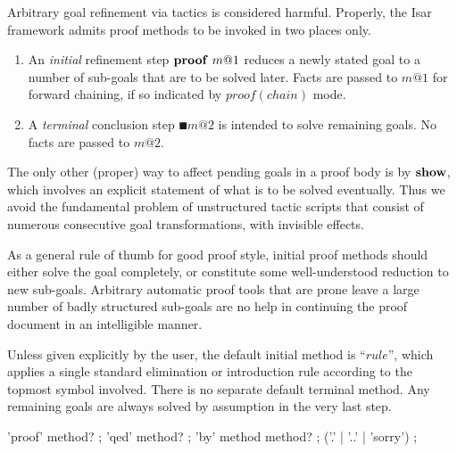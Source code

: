 Arbitrary goal refinement via tactics is considered harmful.  Properly, the
Isar framework admits proof methods to be invoked in two places only.
\begin{enumerate}
\item An \emph{initial} refinement step $\PROOF{m@1}$ reduces a newly stated
  goal to a number of sub-goals that are to be solved later.  Facts are passed
  to $m@1$ for forward chaining, if so indicated by $proof(chain)$ mode.
  
\item A \emph{terminal} conclusion step $\QED{m@2}$ is intended to solve
  remaining goals.  No facts are passed to $m@2$.
\end{enumerate}

The only other (proper) way to affect pending goals in a proof body is by
${\mathord{\mathbf{show}}}$, which involves an explicit statement of what is to be solved
eventually.  Thus we avoid the fundamental problem of unstructured tactic
scripts that consist of numerous consecutive goal transformations, with
invisible effects.

\medskip

As a general rule of thumb for good proof style, initial proof methods should
either solve the goal completely, or constitute some well-understood reduction
to new sub-goals.  Arbitrary automatic proof tools that are prone leave a
large number of badly structured sub-goals are no help in continuing the proof
document in an intelligible manner.

Unless given explicitly by the user, the default initial method is ``$rule$'',
which applies a single standard elimination or introduction rule according to
the topmost symbol involved.  There is no separate default terminal method.
Any remaining goals are always solved by assumption in the very last step.

\begin{rail}
  'proof' method?
  ;
  'qed' method?
  ;
  'by' method method?
  ;
  ('.' | '..' | 'sorry')
  ;
\end{rail}

